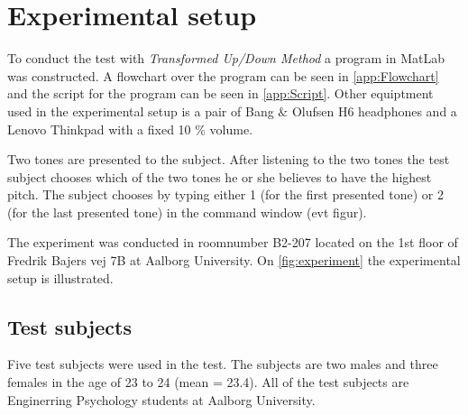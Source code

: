 \section*{Experimental setup}
To conduct the test with \textit{Transformed Up/Down Method} a program in MatLab was constructed. A flowchart over the program can be seen in \autoref{app:Flowchart} and the script for the program can be seen in \autoref{app:Script}. Other equiptment used in the experimental setup is a pair of Bang $\&$ Olufsen H6 headphones and a Lenovo Thinkpad with a fixed 10 \% volume.

Two tones are presented to the subject. After listening to the two tones the test subject chooses which of the two tones he or she believes to have the highest pitch. The subject chooses by typing either 1 (for the first presented tone) or 2 (for the last presented tone) in the command window (evt figur). 

The experiment was conducted in roomnumber B2-207 located on the 1st floor of Fredrik Bajers vej 7B at Aalborg University. On \autoref{fig:experiment} the experimental setup is illustrated. 


\subsection*{Test subjects}
Five test subjects were used in the test. The subjects are two males and three females in the age of 23 to 24 (mean = 23.4). All of the test subjects are Enginerring Psychology students at Aalborg University. 
